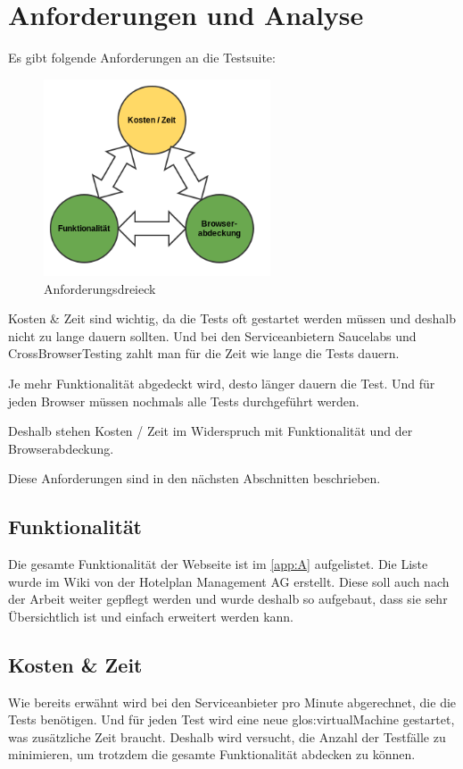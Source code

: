 

\chapter{Anforderungen und Analyse}
\label{sec:analyse}
Es gibt folgende Anforderungen an die Testsuite:
\begin{figure}[H]
	\centering
	\includegraphics[width=0.6\textwidth]{images/triangle.png}
	\caption{Anforderungsdreieck}
	\label{fig:analyse:Anforderungsdreieck}
\end{figure}

Kosten \& Zeit sind wichtig, da die Tests oft gestartet werden müssen und deshalb nicht zu lange dauern sollten. Und bei den Serviceanbietern Saucelabs und CrossBrowserTesting zahlt man für die Zeit wie lange die Tests dauern.

Je mehr Funktionalität abgedeckt wird, desto länger dauern die Test. Und für jeden Browser müssen nochmals alle Tests durchgeführt werden. 

Deshalb stehen Kosten / Zeit im Widerspruch mit Funktionalität und der Browserabdeckung.

Diese Anforderungen sind in den nächsten Abschnitten beschrieben.

\section{Funktionalität}
Die gesamte Funktionalität der Webseite ist im \cref{app:A}  aufgelistet. Die Liste wurde im Wiki von der Hotelplan Management AG erstellt. Diese soll auch nach der Arbeit weiter gepflegt werden und wurde deshalb so aufgebaut, dass sie sehr Übersichtlich ist und einfach erweitert werden kann.

\section{Kosten \& Zeit}
Wie bereits erwähnt wird bei den Serviceanbieter pro Minute abgerechnet, die die Tests benötigen. Und für jeden Test wird eine neue \Gls{glos:virtualMachine} gestartet, was zusätzliche Zeit braucht. Deshalb wird versucht, die Anzahl der Testfälle zu minimieren, um trotzdem die gesamte Funktionalität abdecken zu können.